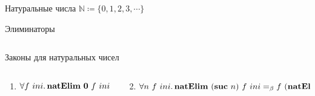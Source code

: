 \begin{frame}[fragile]{Натуральные числа $\mathbb{N} \coloneqq \{0, 1, 2, 3, \cdots\}$}
\begin{block}{Элиминаторы}
\begin{columns}[onlytextwidth]
            \end{columns}
        \end{block}
        \pause
        \vspace{-0.5em}
        \begin{block}{Законы для натуральных чисел}
            \vspace{-0.7em}
            \begin{columns}[onlytextwidth]
                \begin{column}{0.375\textwidth}
                    \begin{enumerate}
                        \item \pause $\forall f~ini\ldotp \mathbf{natElim} ~ \mathbf{0} ~ f ~ ini =_\beta ini$
                    \end{enumerate}
                \end{column}\hfill%
                \begin{column}{0.595\textwidth}
                    \begin{enumerate}
                        \setcounter{enumi}{1}
                        \item \pause $\forall n~f~ini\ldotp \mathbf{natElim} ~ (\mathbf{suc} ~ n) ~ f ~ ini =_\beta f ~ (\mathbf{natElim} ~ n ~ f ~ ini)$
                    \end{enumerate}
                \end{column}
            \end{columns}
        \end{block}
    \end{frame}

